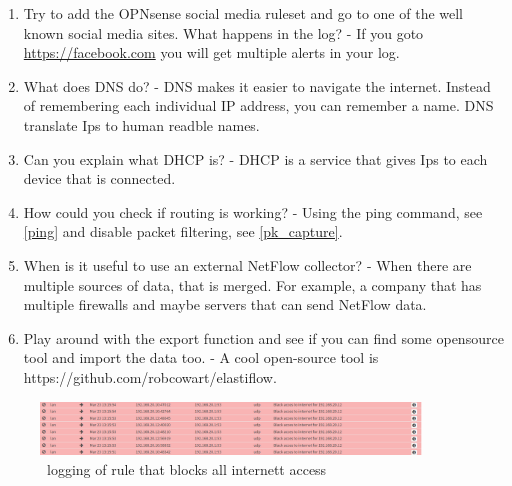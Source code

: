 \begin{enumerate}
    \item Try to add the OPNsense social media ruleset and go to one of the well known social media sites. What happens in the log? - If you goto \url{https://facebook.com} you will get multiple alerts in your log.
    \item What does DNS do? - DNS makes it easier to navigate the internet. Instead of remembering each individual IP address, you can remember a name. DNS translate Ips to human readble names.
    \item Can you explain what DHCP is? - DHCP is a service that gives Ips to each device that is connected.
    \item How could you check if routing is working? - Using the ping command, see \ref{ping} and disable packet filtering, see \ref{pk_capture}.
    \item When is it useful to use an external NetFlow collector? - When there are multiple sources of data, that is merged. For example, a company that has multiple firewalls and maybe servers that can send NetFlow data.
    \item Play around with the export function and see if you can find some opensource tool and import the data too. - A cool open-source tool is https://github.com/robcowart/elastiflow.
\end{enumerate}

\begin{figure}[h!]
    \centering
    \includegraphics[width=0.9\textwidth]{Images/firewall/block_internet_access.PNG}
    \caption{\opnsense\ logging of rule that blocks all internett access}
    \label{opnsense:logging_blocked_internet_access}
\end{figure}

